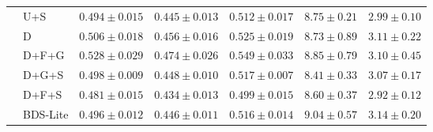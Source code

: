 \begin{tabular}{llccccc}
 & U+S & $0.494 \pm 0.015$ & $0.445 \pm 0.013$ & $0.512 \pm 0.017$ & $8.75 \pm 0.21$ & $2.99 \pm 0.10$ \\
 & D & $0.506 \pm 0.018$ & $0.456 \pm 0.016$ & $0.525 \pm 0.019$ & $8.73 \pm 0.89$ & $3.11 \pm 0.22$ \\
 & D+F+G & $0.528 \pm 0.029$ & $0.474 \pm 0.026$ & $0.549 \pm 0.033$ & $8.85 \pm 0.79$ & $3.10 \pm 0.45$ \\
 & D+G+S & $0.498 \pm 0.009$ & $0.448 \pm 0.010$ & $0.517 \pm 0.007$ & $8.41 \pm 0.33$ & $3.07 \pm 0.17$ \\
 & D+F+S & $0.481 \pm 0.015$ & $0.434 \pm 0.013$ & $0.499 \pm 0.015$ & $8.60 \pm 0.37$ & $2.92 \pm 0.12$ \\
 & BDS-Lite & $0.496 \pm 0.012$ & $0.446 \pm 0.011$ & $0.516 \pm 0.014$ & $9.04 \pm 0.57$ & $3.14 \pm 0.20$ \\
\bottomrule
\end{tabular}
